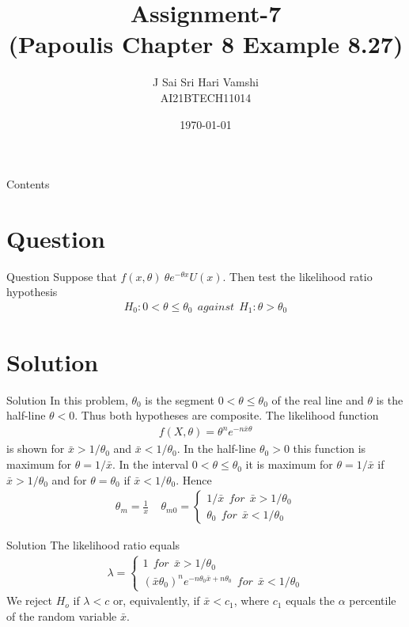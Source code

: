 \documentclass{beamer}
\title{Assignment-7\\(Papoulis Chapter 8 Example 8.27)}
\author{J Sai Sri Hari Vamshi\\ AI21BTECH11014}
\date{\today}
\begin{document}
\begin{frame}
    \titlepage 
\end{frame}



\begin{frame}{Contents}
    \tableofcontents
\end{frame}

\section{Question}
\begin{frame}{Question}
	Suppose that $f(x, \theta) ~ \theta e^{-\theta x} U(x)$. Then test the likelihood ratio hypothesis \\
	\begin{align*}
	H_0:0<\theta\leq\theta_0 \ \ against \ \ H_1:\theta>\theta_0
	\end{align*}
\end{frame}

\section{Solution}

\begin{frame}{Solution}
In this problem, $\theta_0$ is the segment $0 < \theta \leq \theta_0 $ of the real line and $\theta$ is the half-line
    $\theta < 0$. Thus both hypotheses are composite. The likelihood function
    \begin{align}
        f(X,\theta) = \theta^n e^{-n\bar{x}\theta} 
    \end{align}
    is shown for $\bar{x} > 1/\theta_0$ and $\bar{x} < 1/\theta_0$. In the half-line $\theta_0 > 0$ this function
    is maximum for $\theta = 1/\bar{x}$. In the interval $0 < \theta \leq \theta_0$ it is maximum for $\theta = 1/\bar{x}$ if
    $\bar{x}> 1/\theta_0$ and for $\theta = \theta_0$ if $\bar{x} < 1/\theta_0$. Hence
    \begin{align}
      \theta_m = \frac{1}{x} ~~~~~ \theta_{m0}= \begin{cases}
        1/\bar{x} ~~for ~~\bar{x} > 1/\theta_0\\
        \theta_0 ~~for ~~\bar{x} < 1/\theta_0
      \end{cases}
    \end{align}
\end{frame}

\begin{frame}{Solution}
    The likelihood ratio equals
    \begin{align}
      \lambda = \begin{cases}
        1 ~~for ~~\bar{x} > 1/\theta_0\\
        (\bar{x}\theta_0)^ne^{-n\theta_0\bar{x}+n\theta_0}~~for ~~\bar{x} < 1/\theta_0
      \end{cases}
    \end{align}
    We reject $H_o$ if $\lambda < c$ or, equivalently, if $\bar{x} < c_1$, where $c_1$ equals the $\alpha$ percentile of the
    random variable $\bar{x}$. 
\end{frame}
\end{document}
